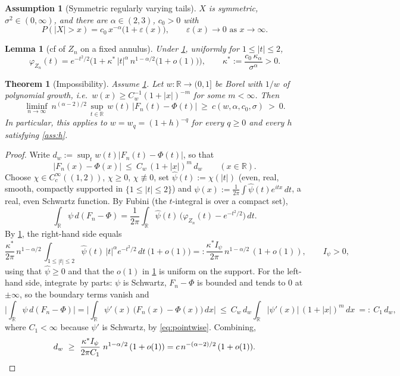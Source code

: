 \documentclass[10pt,a4paper]{amsart}
\newtheorem{assumption}{Assumption}
\newtheorem{lemma}{Lemma}
\newtheorem{theorem}{Theorem}
\newcommand{\R}{\mathbb{R}}
\newcommand{\h}{h}
\begin{document}
\begin{assumption}[Symmetric regularly varying tails]\label{ass:RV}
$X$ is symmetric, $\sigma^2\in(0,\infty)$, and there are $\alpha\in(2,3)$, $c_0>0$ with
\[
P(|X|>x)=c_0\,x^{-\alpha}\big(1+\varepsilon(x)\big),\qquad
\varepsilon(x)\to0 \text{ as } x\to\infty .
\]
\end{assumption}

\begin{lemma}[cf of $Z_n$ on a fixed annulus]\label{lem:cfZn}
Under \cref{ass:RV}, uniformly for $1\le|t|\le2$,
\[
\varphi_{Z_n}(t)=e^{-t^2/2}\Big(1+\kappa^\ast\,|t|^\alpha\,n^{1-\alpha/2}\big(1+o(1)\big)\Big),
\qquad \kappa^\ast:=\frac{c_0\,\kappa_\alpha}{\sigma^\alpha}>0 .
\]
\end{lemma}

\begin{theorem}[Impossibility]\label{thm:lower}
Assume \cref{ass:RV}. Let $w:\R\to(0,1]$ be Borel with $1/w$ of polynomial growth,
i.e.\ $w(x)\ge C_w^{-1}(1+|x|)^{-m}$ for some $m<\infty$. Then
\[
\liminf_{n\to\infty}\ n^{(\alpha-2)/2}\,
\sup_{t\in\R}\,w(t)\,\big|F_n(t)-\Phi(t)\big|\ \ge\ c(w,\alpha,c_0,\sigma)\ >\ 0 .
\]
In particular, this applies to $w=w_q=(1+\h)^{-q}$ for every $q\ge0$ and every $\h$
satisfying \cref{ass:h}.
\end{theorem}

\begin{proof}
Write $d_w:=\sup_t w(t)|F_n(t)-\Phi(t)|$, so that
\begin{equation}\label{eq:pointwise}
|F_n(x)-\Phi(x)|\ \le\ C_w\,(1+|x|)^m\, d_w\qquad(x\in\R).
\end{equation}
Choose $\chi\in C_c^\infty((1,2))$, $\chi\ge0$, $\chi\not\equiv0$, set
$\widehat\psi(t):=\chi(|t|)$ (even, real, smooth, compactly supported in
$\{1\le|t|\le2\}$) and
$\psi(x):=\frac{1}{2\pi}\int\widehat\psi(t)e^{itx}\,dt$, a real, even Schwartz
function. By Fubini (the $t$-integral is over a compact set),
\begin{equation}\label{eq:parseval}
\int_\R \psi\,d(F_n-\Phi)
=\frac{1}{2\pi}\int_\R \widehat\psi(t)\,\big(\varphi_{Z_n}(t)-e^{-t^2/2}\big)\,dt .
\end{equation}
By \cref{lem:cfZn}, the right-hand side equals
\[
\frac{\kappa^\ast}{2\pi}\,n^{1-\alpha/2}\,
\int_{1\le|t|\le2}\widehat\psi(t)\,|t|^\alpha e^{-t^2/2}\,dt\ \big(1+o(1)\big)
=:\frac{\kappa^\ast I_\psi}{2\pi}\,n^{1-\alpha/2}\,(1+o(1)),
\qquad I_\psi>0,
\]
using that $\widehat\psi\ge0$ and that the $o(1)$ in \cref{lem:cfZn} is uniform on the
support. For the left-hand side, integrate by parts: $\psi$ is Schwartz, $F_n-\Phi$ is
bounded and tends to $0$ at $\pm\infty$, so the boundary terms vanish and
\[
\Big|\int_\R \psi\,d(F_n-\Phi)\Big|
=\Big|\int_\R \psi'(x)\,\big(F_n(x)-\Phi(x)\big)\,dx\Big|
\ \le\ C_w\,d_w \int_\R |\psi'(x)|\,(1+|x|)^m\,dx\ =:\ C_1\,d_w,
\]
where $C_1<\infty$ because $\psi'$ is Schwartz, by \eqref{eq:pointwise}. Combining,
\[
d_w\ \ge\ \frac{\kappa^\ast I_\psi}{2\pi C_1}\; n^{1-\alpha/2}\,(1+o(1))
= c\, n^{-(\alpha-2)/2}\,(1+o(1)) . \qedhere
\]
\end{proof}
\end{document}
